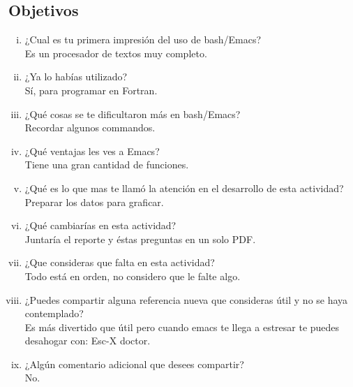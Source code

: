 \documentclass[12pt]{article}
\begin{document}
\subsection{Objetivos}
    \begin{enumerate}[i.]
    \item ¿Cual es tu primera impresión del uso de bash/Emacs?
    \\ \noindent Es un procesador de textos muy completo.
    \item ¿Ya lo habías utilizado? 
    \\ \noindent Sí, para programar en Fortran.
    \item ¿Qué cosas se te dificultaron más en bash/Emacs?  
    \\ \noindent Recordar algunos commandos. 
    \item ¿Qué ventajas les ves a Emacs? 
    \\ \noindent Tiene una gran cantidad de funciones. 
    \item ¿Qué es lo que mas te llamó la atención en el desarrollo de esta actividad?
    \\ \noindent Preparar los datos para graficar.
    \item ¿Qué cambiarías en esta actividad?
    \\ \noindent Juntaría el reporte y éstas preguntas en un solo PDF.
    \item ¿Que consideras que falta en esta actividad? 
    \\ \noindent Todo está en orden, no considero que le falte algo.
    \item ¿Puedes compartir alguna referencia nueva que consideras útil y no se haya contemplado? 
    \\ \noindent Es más divertido que útil pero cuando emacs te llega a estresar te puedes desahogar con: Esc-X doctor.
    \item ¿Algún comentario adicional que desees compartir?
    \\ \noindent No.
    \end{enumerate}
    
\end{document}
